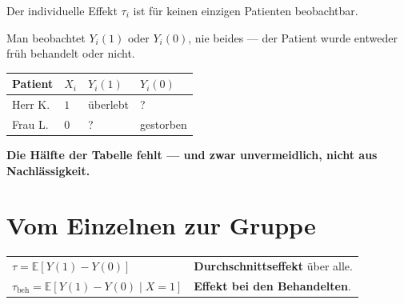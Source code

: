 \begin{merksatz}
Der individuelle Effekt $\tau_i$ ist für keinen einzigen Patienten beobachtbar.

Man beobachtet $Y_i(1)$ oder $Y_i(0)$, nie beides --- der Patient wurde entweder früh behandelt oder nicht.

\begin{center}
{\small
\renewcommand{\arraystretch}{1.5}
\begin{tabular}{@{}P{1.8cm}P{1.6cm}P{1.8cm}P{1.8cm}@{}}
\toprule
\textbf{Patient} & $X_i$ & $Y_i(1)$ & $Y_i(0)$\\
\midrule
Herr K. & $1$ & \textcolor{gruen}{überlebt} & \textcolor{akzent}{?}\\
Frau L. & $0$ & \textcolor{akzent}{?} & \textcolor{gruen}{gestorben}\\
\bottomrule
\end{tabular}}
\end{center}

\begin{center}
\begin{minipage}{0.9\textwidth}
\textbf{Die Hälfte der Tabelle fehlt --- und zwar unvermeidlich, nicht aus Nachlässigkeit.}
\end{minipage}
\end{center}

\begin{center}
\begin{minipage}{0.88\textwidth}
\end{minipage}
\end{center}
\end{merksatz}

\section{Vom Einzelnen zur Gruppe}

\begin{definition}
\begin{center}
{\small
\renewcommand{\arraystretch}{1.6}
\begin{tabular}{@{}P{2.8cm}P{5.8cm}@{}}
\toprule
$\tau = \mathbb{E}[Y(1)-Y(0)]$ & \textbf{Durchschnittseffekt} über alle.\\
$\tau_{\text{beh}} = \mathbb{E}[Y(1)-Y(0) \mid X=1]$ & \textbf{Effekt bei den Behandelten}.\\
\bottomrule
\end{tabular}}
\end{center}
\end{definition}

